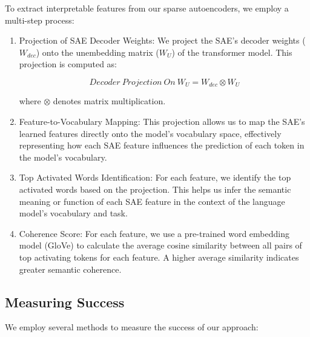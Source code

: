 To extract interpretable features from our sparse autoencoders, we employ a multi-step process:

\begin{enumerate}
    \item Projection of SAE Decoder Weights: We project the SAE's decoder weights ($W_{dec}$) onto the unembedding matrix ($W_{U}$) of the transformer model. This projection is computed as:
    
        \[ Decoder\ Projection\ On\ W_{U} = W_{dec} \otimes W_{U} \]
    
        where $\otimes$ denotes matrix multiplication.
    
    \item Feature-to-Vocabulary Mapping: This projection allows us to map the SAE's learned features directly onto the model's vocabulary space, effectively representing how each SAE feature influences the prediction of each token in the model's vocabulary.
    
    \item Top Activated Words Identification: For each feature, we identify the top activated words based on the projection. This helps us infer the semantic meaning or function of each SAE feature in the context of the language model's vocabulary and task.

    \item Coherence Score: For each feature, we use a pre-trained word embedding model (GloVe) to calculate the average cosine similarity between all pairs of top activating tokens for each feature. A higher average similarity indicates greater semantic coherence.

    
\end{enumerate}

\subsection{Measuring Success}

We employ several methods to measure the success of our approach:

